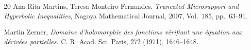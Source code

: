 \begin{thebibliography}{20}
  Ana Rita Martins,
  Teresa Monteiro Fernandes. 
  \textit{Truncated Microsupport and Hyperbolic Inequalities}, 
  Nagoya Mathematical Journal, 2007, Vol.\ 185, pp.~63--91. 
  
  
   Martin Zerner,  
  \textit{Domaine d'holomorphie des fonctions v\'erifiant 
  une \'equation aux d\'eriv\'ees partielles.} 
  C. R. Acad. Sci. Paris, 272 (1971), 1646--1648.

\end{thebibliography}




